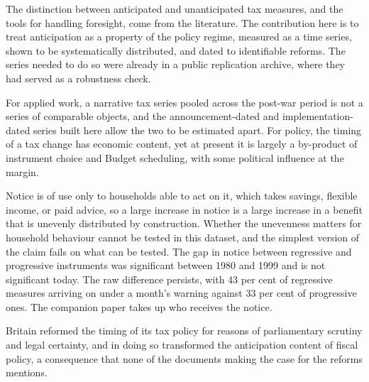 \documentclass[11pt,a4paper]{article}
\begin{document}
The distinction between anticipated and unanticipated tax measures, and the tools for handling
foresight, come from the literature. The contribution here is to treat anticipation as a property of the policy regime, measured as a time series, shown to be systematically distributed, and dated to identifiable reforms. The series needed to do so were already in a public replication archive, where they had served as a robustness check.

For applied work, a narrative tax series pooled across the post-war period is not a series of
comparable objects, and the announcement-dated and implementation-dated series built here allow the
two to be estimated apart. For policy, the timing of a tax change has economic content, yet at
present it is largely a by-product of instrument choice and Budget scheduling, with some political
influence at the margin.

Notice is of use only to households able to act on it, which takes savings, flexible income, or paid advice, so a large increase in notice is a large increase in a benefit that is unevenly distributed by construction. Whether the unevenness matters for household behaviour
cannot be tested in this dataset, and the simplest version of the claim fails on what can be tested. The gap in notice between regressive and progressive instruments was significant between
1980 and 1999 and is not significant today. The raw difference persists, with 43 per cent of regressive
measures arriving on under a month's warning against 33 per cent of progressive ones. The companion paper takes up
who receives the notice.

Britain reformed the timing of its tax policy for reasons of parliamentary scrutiny and legal
certainty, and in doing so transformed the anticipation content of fiscal policy, a consequence that
none of the documents making the case for the reforms mentions.



\end{document}
